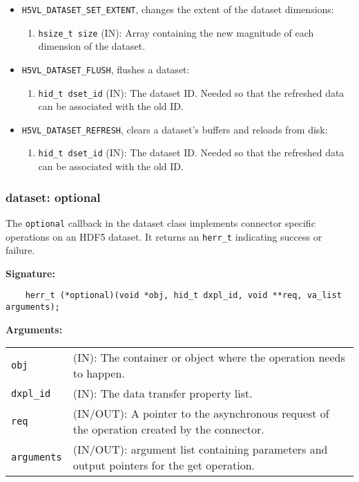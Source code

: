 \begin{itemize}
\item \texttt{H5VL\_DATASET\_SET\_EXTENT}, changes the extent of the dataset dimensions:
  \begin{enumerate}
  \item \texttt{hsize\_t size} (IN): Array containing the new magnitude of each dimension of the dataset. 
  \end{enumerate}
\item \texttt{H5VL\_DATASET\_FLUSH}, flushes a dataset:
  \begin{enumerate}
  \item \texttt{hid\_t dset\_id} (IN): The dataset ID. Needed so that the refreshed data can be associated with the old ID. 
  \end{enumerate}
\item \texttt{H5VL\_DATASET\_REFRESH}, clears a dataset's buffers and reloads from disk:
  \begin{enumerate}
  \item \texttt{hid\_t dset\_id} (IN): The dataset ID. Needed so that the refreshed data can be associated with the old ID. 
  \end{enumerate}
\end{itemize}

\subsubsection{dataset: optional}
The \texttt{optional} callback in the dataset class implements connector specific operations on an HDF5 dataset. It returns an \texttt{herr\_t} indicating success or failure. \bigskip

\begin{mdframed}[style=bgbox]
\textbf{Signature:}
\begin{lstlisting}
    herr_t (*optional)(void *obj, hid_t dxpl_id, void **req, va_list arguments);
\end{lstlisting}

\textbf{Arguments:}\\
\begin{tabular}{l p{13.5cm}}
  \texttt{obj} & (IN): The container or object where the operation needs to happen.\\
  \texttt{dxpl\_id} & (IN): The data transfer property list.\\
  \texttt{req} & (IN/OUT): A pointer to the asynchronous request of the operation created by the connector.\\
  \texttt{arguments} & (IN/OUT): argument list containing parameters and output pointers for the get operation. \\
\end{tabular}
\end{mdframed}

